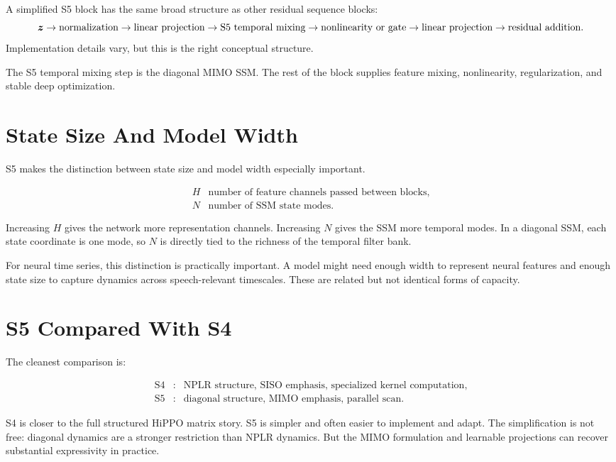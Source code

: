A simplified S5 block has the same broad structure as other residual sequence blocks:
\[
  \bm{z}
  \rightarrow
  \text{normalization}
  \rightarrow
  \text{linear projection}
  \rightarrow
  \text{S5 temporal mixing}
  \rightarrow
  \text{nonlinearity or gate}
  \rightarrow
  \text{linear projection}
  \rightarrow
  \text{residual addition}.
\]
Implementation details vary, but this is the right conceptual structure.

The S5 temporal mixing step is the diagonal MIMO SSM. The rest of the block supplies
feature mixing, nonlinearity, regularization, and stable deep optimization.

\section{State Size And Model Width}

S5 makes the distinction between state size and model width especially important.

\[
\begin{array}{ll}
H & \text{number of feature channels passed between blocks}, \\
N & \text{number of SSM state modes}.
\end{array}
\]

Increasing $H$ gives the network more representation channels. Increasing $N$ gives the
SSM more temporal modes. In a diagonal SSM, each state coordinate is one mode, so $N$ is
directly tied to the richness of the temporal filter bank.

For neural time series, this distinction is practically important. A model might need
enough width to represent neural features and enough state size to capture dynamics
across speech-relevant timescales. These are related but not identical forms of capacity.

\section{S5 Compared With S4}

The cleanest comparison is:

\[
\begin{array}{lll}
\text{S4} &:& \text{NPLR structure, SISO emphasis, specialized kernel computation}, \\
\text{S5} &:& \text{diagonal structure, MIMO emphasis, parallel scan}.
\end{array}
\]

S4 is closer to the full structured HiPPO matrix story. S5 is simpler and often easier to
implement and adapt. The simplification is not free: diagonal dynamics are a stronger
restriction than NPLR dynamics. But the MIMO formulation and learnable projections can
recover substantial expressivity in practice.

